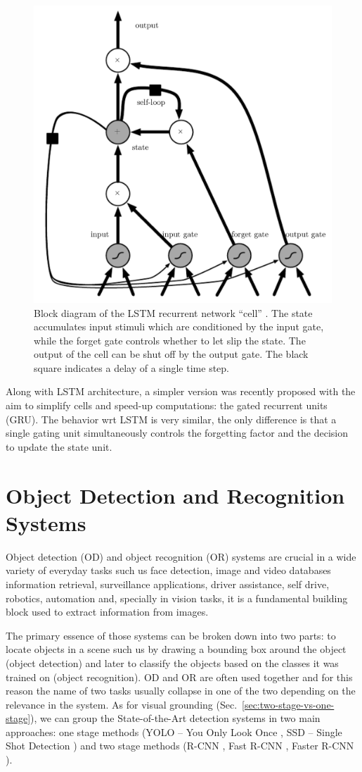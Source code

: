 \begin{figure}
  \centering
  \includegraphics[width=.6\textwidth]{figures/lstm.png}
  \caption[Block diagram of the LSTM recurrent network cell]{ Block
    diagram of the LSTM recurrent network ``cell''
    \cite{goodfellow2016deep}. The state accumulates input stimuli
    which are conditioned by the input gate, while the forget gate
    controls whether to let slip the state. The output of the cell can
    be shut off by the output gate. The black square indicates a delay
    of a single time step. }
  \label{fig:lstm}
\end{figure}

Along with LSTM architecture, a simpler version was recently proposed
with the aim to simplify cells and speed-up computations: the gated
recurrent units (GRU). The behavior wrt LSTM is very similar, the only
difference is that a single gating unit simultaneously controls the
forgetting factor and the decision to update the state unit.

\section{Object Detection and Recognition Systems}
\label{sec:object-detection-recognition}

Object detection (OD) and object recognition (OR) systems are crucial
in a wide variety of everyday tasks such us face detection, image and
video databases information retrieval, surveillance applications,
driver assistance, self drive, robotics, automation and, specially in
vision tasks, it is a fundamental building block used to extract
information from images.

The primary essence of those systems can be broken down into two
parts: to locate objects in a scene such us by drawing a bounding box
around the object (object detection) and later to classify the objects
based on the classes it was trained on (object recognition). OD and OR
are often used together and for this reason the name of two tasks
usually collapse in one of the two depending on the relevance in the
system. As for visual grounding
(Sec.~\ref{sec:two-stage-vs-one-stage}), we can group the
State-of-the-Art detection systems in two main approaches: one stage
methods (YOLO -- You Only Look Once \cite{redmon2016you}, SSD --
Single Shot Detection \cite{liu2016ssd}) and two stage methods (R-CNN
\cite{girshick2014rich}, Fast R-CNN \cite{girshick2015fast}, Faster
R-CNN \cite{ren2015faster}). 

